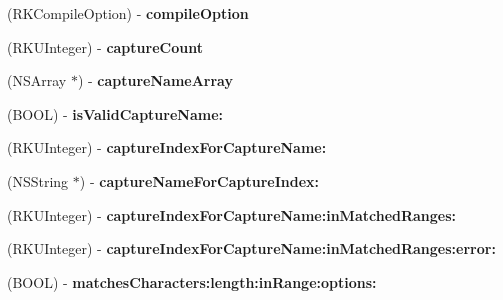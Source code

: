\begin{DoxyCompactItemize}
\item 
\hypertarget{interface_r_k_regex_a4a46ed536513f45f934098109159e86f}{(R\-K\-Compile\-Option) -\/ {\bfseries compile\-Option}}\label{interface_r_k_regex_a4a46ed536513f45f934098109159e86f}

\item 
\hypertarget{interface_r_k_regex_a933d645e53bc3011cf043bbe69647191}{(R\-K\-U\-Integer) -\/ {\bfseries capture\-Count}}\label{interface_r_k_regex_a933d645e53bc3011cf043bbe69647191}

\item 
\hypertarget{interface_r_k_regex_a85c7c3e1008c41063a3cef874bb09e5f}{(N\-S\-Array $\ast$) -\/ {\bfseries capture\-Name\-Array}}\label{interface_r_k_regex_a85c7c3e1008c41063a3cef874bb09e5f}

\item 
\hypertarget{interface_r_k_regex_a41148691b39fea4c7abeb85498044470}{(B\-O\-O\-L) -\/ {\bfseries is\-Valid\-Capture\-Name\-:}}\label{interface_r_k_regex_a41148691b39fea4c7abeb85498044470}

\item 
\hypertarget{interface_r_k_regex_a64f0e9b631149094cc7227adb0a2ec39}{(R\-K\-U\-Integer) -\/ {\bfseries capture\-Index\-For\-Capture\-Name\-:}}\label{interface_r_k_regex_a64f0e9b631149094cc7227adb0a2ec39}

\item 
\hypertarget{interface_r_k_regex_adea1582c8fc35ad3408445c8467b3828}{(N\-S\-String $\ast$) -\/ {\bfseries capture\-Name\-For\-Capture\-Index\-:}}\label{interface_r_k_regex_adea1582c8fc35ad3408445c8467b3828}

\item 
\hypertarget{interface_r_k_regex_ac006c9fee29acc444c2596bf99e415cc}{(R\-K\-U\-Integer) -\/ {\bfseries capture\-Index\-For\-Capture\-Name\-:in\-Matched\-Ranges\-:}}\label{interface_r_k_regex_ac006c9fee29acc444c2596bf99e415cc}

\item 
\hypertarget{interface_r_k_regex_a54f94fa012e48e42c376908f58164e1c}{(R\-K\-U\-Integer) -\/ {\bfseries capture\-Index\-For\-Capture\-Name\-:in\-Matched\-Ranges\-:error\-:}}\label{interface_r_k_regex_a54f94fa012e48e42c376908f58164e1c}

\item 
\hypertarget{interface_r_k_regex_aa33efb469a55abee4c508f748d703aef}{(B\-O\-O\-L) -\/ {\bfseries matches\-Characters\-:length\-:in\-Range\-:options\-:}}\label{interface_r_k_regex_aa33efb469a55abee4c508f748d703aef}


\end{DoxyCompactItemize}
